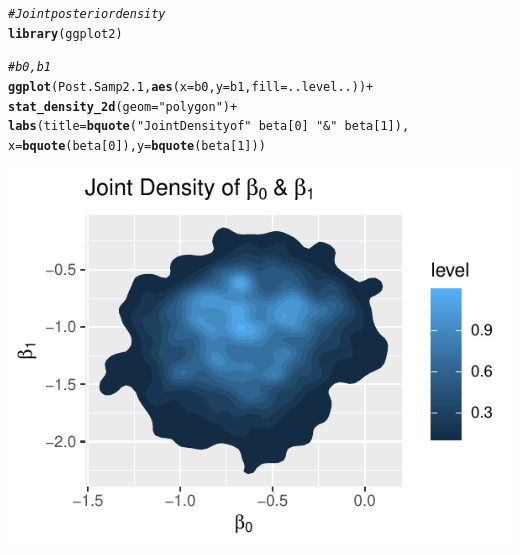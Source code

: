 \documentclass[11pt,english]{article}\usepackage[]{graphicx}\usepackage[]{xcolor}
\makeatletter
\def\maxwidth{ %
  \ifdim\Gin@nat@width>\linewidth
    \linewidth
  \else
    \Gin@nat@width
  \fi
}
\newcommand{\hlnum}[1]{\textcolor[rgb]{0.686,0.059,0.569}{#1}}%
\newcommand{\hlstr}[1]{\textcolor[rgb]{0.192,0.494,0.8}{#1}}%
\newcommand{\hlcom}[1]{\textcolor[rgb]{0.678,0.584,0.686}{\textit{#1}}}%
\newcommand{\hlopt}[1]{\textcolor[rgb]{0,0,0}{#1}}%
\newcommand{\hlstd}[1]{\textcolor[rgb]{0.345,0.345,0.345}{#1}}%
\newcommand{\hlkwc}[1]{\textcolor[rgb]{0.333,0.667,0.333}{#1}}%
\newcommand{\hlkwd}[1]{\textcolor[rgb]{0.737,0.353,0.396}{\textbf{#1}}}%
\newenvironment{kframe}{%
 \def\at@end@of@kframe{}%
 \ifinner\ifhmode%
  \def\at@end@of@kframe{\end{minipage}}%
  \begin{minipage}{\columnwidth}%
 \fi\fi%
 \def\FrameCommand##1{\hskip\@totalleftmargin \hskip-\fboxsep
 \colorbox{shadecolor}{##1}\hskip-\fboxsep
     \hskip-\linewidth \hskip-\@totalleftmargin \hskip\columnwidth}%
 \MakeFramed {\advance\hsize-\width
   \@totalleftmargin\z@ \linewidth\hsize
   \@setminipage}}%
 {\par\unskip\endMakeFramed%
 \at@end@of@kframe}
\newenvironment{knitrout}{}{} %
\makeatother
\begin{document}
\begin{center}
\begin{knitrout}
\color{fgcolor}\begin{kframe}
\begin{alltt}
\hlcom{# Joint posterior density}
\hlkwd{library}\hlstd{(ggplot2)}

\hlcom{# b0,b1}
\hlkwd{ggplot}\hlstd{(Post.Samp2.1,} \hlkwd{aes}\hlstd{(}\hlkwc{x} \hlstd{= b0,} \hlkwc{y} \hlstd{= b1,} \hlkwc{fill} \hlstd{= ..level..))} \hlopt{+}
  \hlkwd{stat_density_2d}\hlstd{(}\hlkwc{geom} \hlstd{=} \hlstr{"polygon"}\hlstd{)} \hlopt{+}
  \hlkwd{labs}\hlstd{(}\hlkwc{title} \hlstd{=} \hlkwd{bquote}\hlstd{(}\hlstr{"Joint Density of"} \hlopt{~} \hlstd{beta[}\hlnum{0}\hlstd{]} \hlopt{~} \hlstr{"&"} \hlopt{~} \hlstd{beta[}\hlnum{1}\hlstd{]),}
\hlkwc{x} \hlstd{=} \hlkwd{bquote}\hlstd{(beta[}\hlnum{0}\hlstd{]),} \hlkwc{y} \hlstd{=} \hlkwd{bquote}\hlstd{(beta[}\hlnum{1}\hlstd{]))}
\end{alltt}
\end{kframe}
\includegraphics[width=\maxwidth]{figure/unnamed-chunk-31-1} 
\end{knitrout}
\par\end{center}
\end{document}
